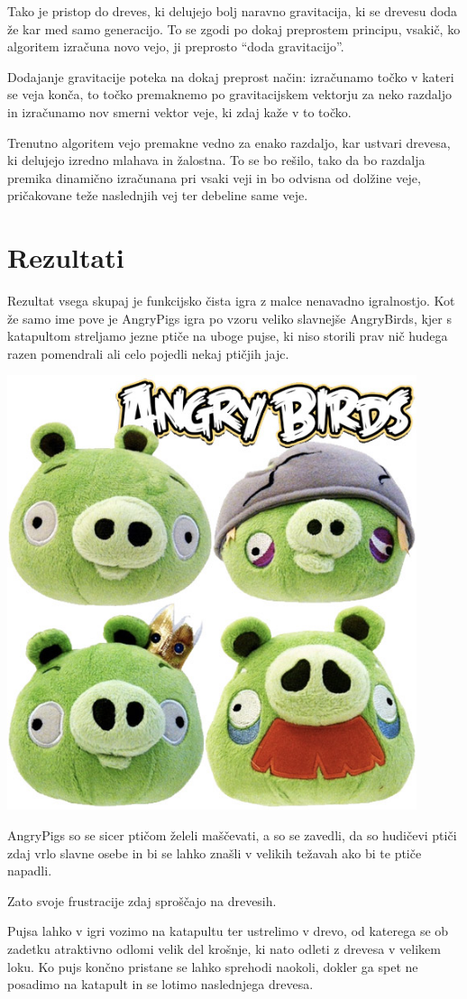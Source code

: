 \documentclass[10pt,a4paper,oneside]{book}
\begin{document}
Tako je pristop do dreves, ki delujejo bolj naravno gravitacija, ki se
drevesu doda že kar med samo generacijo. To se zgodi po dokaj
preprostem principu, vsakič, ko algoritem izračuna novo vejo, ji
preprosto ``doda gravitacijo''.

Dodajanje gravitacije poteka na dokaj preprost način: izračunamo točko
v kateri se veja konča, to točko premaknemo po gravitacijskem vektorju
za neko razdaljo in izračunamo nov smerni vektor veje, ki zdaj kaže v
to točko.

Trenutno algoritem vejo premakne vedno za enako razdaljo, kar ustvari
drevesa, ki delujejo izredno mlahava in žalostna. To se bo rešilo,
tako da bo razdalja premika dinamično izračunana pri vsaki veji in bo
odvisna od dolžine veje, pričakovane teže naslednjih vej ter debeline
same veje.

\chapter{Rezultati}

Rezultat vsega skupaj je funkcijsko čista igra z malce nenavadno
igralnostjo. Kot že samo ime pove je AngryPigs igra po vzoru veliko
slavnejše AngryBirds, kjer s katapultom streljamo jezne ptiče na uboge
pujse, ki niso storili prav nič hudega razen pomendrali ali celo
pojedli nekaj ptičjih jajc.

\includegraphics[width=12cm]{PigPlushies.jpg}

AngryPigs so se sicer ptičom želeli maščevati, a so se zavedli, da so
hudičevi ptiči zdaj vrlo slavne osebe in bi se lahko znašli v velikih
težavah ako bi te ptiče napadli.

Zato svoje frustracije zdaj sproščajo na drevesih.

Pujsa lahko v igri vozimo na katapultu ter ustrelimo v drevo, od
katerega se ob zadetku atraktivno odlomi velik del krošnje, ki nato
odleti z drevesa v velikem loku. Ko pujs končno pristane se lahko
sprehodi naokoli, dokler ga spet ne posadimo na katapult in se lotimo
naslednjega drevesa.
\end{document}
